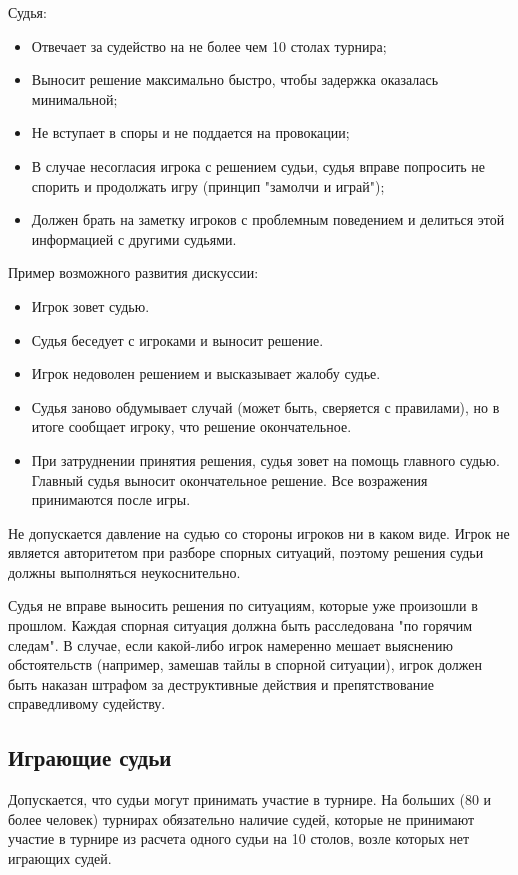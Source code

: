 Судья:
\begin{itemize}
	\item Отвечает за судейство на не более чем 10 столах турнира;
	\item Выносит решение максимально быстро, чтобы задержка оказалась минимальной;
	\item Не вступает в споры и не поддается на провокации;
	\item В случае несогласия игрока с решением судьи, судья вправе попросить не спорить и продолжать игру (принцип "замолчи и играй");
	\item Должен брать на заметку игроков с проблемным поведением и делиться этой информацией с другими судьями.
\end{itemize}

Пример возможного развития дискуссии:
\begin{itemize}
	\item Игрок зовет судью.
	\item Судья беседует с игроками и выносит решение.
	\item Игрок недоволен решением и высказывает жалобу судье.
	\item Судья заново обдумывает случай (может быть, сверяется с правилами), но в итоге сообщает игроку, что решение окончательное.
	\item При затруднении принятия решения, судья зовет на помощь главного судью. Главный судья выносит окончательное решение. Все возражения принимаются после игры. 
\end{itemize}

Не допускается давление на судью со стороны игроков ни в каком виде. Игрок не является авторитетом при разборе спорных ситуаций, поэтому решения судьи должны выполняться неукоснительно.

Судья не вправе выносить решения по ситуациям, которые уже произошли в прошлом. Каждая спорная ситуация должна быть расследована "по горячим следам". В случае, если какой-либо игрок намеренно мешает выяснению обстоятельств (например, замешав тайлы в спорной ситуации), игрок должен быть наказан штрафом за деструктивные действия и препятствование справедливому судейству.

\subsection{Играющие судьи}

Допускается, что судьи могут принимать участие в турнире. На больших (80 и более человек) турнирах обязательно наличие судей, которые не принимают участие в турнире из расчета одного судьи на 10 столов, возле которых нет играющих судей.

